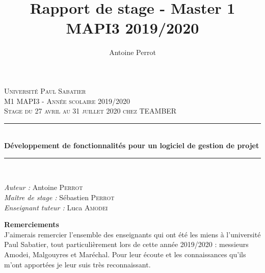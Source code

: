 \documentclass[12pt]{article}
\title{Rapport de stage - Master 1 MAPI3 2019/2020}
\author{Antoine Perrot}
\begin{document}
\begin{titlepage}

\newcommand{\HRule}{\rule{\linewidth}{0.5mm}} %

\center %
 

\textsc{\LARGE Université Paul Sabatier}\\[1.5cm] %
\textsc{\Large M1 MAPI3 - Année scolaire 2019/2020}\\[0.5cm] %
\textsc{\large Stage du 27 avril au 31 juillet 2020 chez TEAMBER}\\[0.5cm] %

\HRule \\[0.4cm]
{ \huge \bfseries Développement de fonctionnalités pour un logiciel de gestion de projet}\\[0.4cm] %
\HRule \\[1.5cm]

\begin{minipage}{0.4\textwidth}
\begin{flushleft} \large
\emph{Auteur :} Antoine \textsc{Perrot} \\
\emph{Maître de stage :} Sébastien \textsc{Perrot} \\
\emph{Enseignant tuteur :}  Luca \textsc{Amodei} \\
\end{flushleft}
\end{minipage}





\vfill %

\end{titlepage}

\newpage
\textbf{\huge Remerciements}\\

J'aimerais remercier l'ensemble des enseignants qui ont été les miens à l'université Paul Sabatier, tout particulièrement lors de cette année 2019/2020 : messieurs Amodei, Malgouyres et Maréchal. Pour leur écoute et les connaissances qu'ils m'ont apportées je leur suis très reconnaissant.\\
\end{document}
